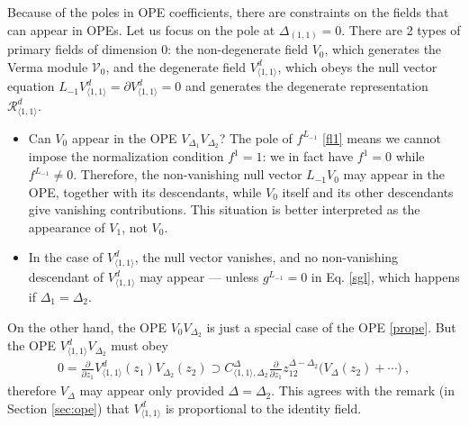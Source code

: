 \documentclass[12pt, a4paper]{article}
\theoremstyle{break}
\begin{document}
Because of the poles in OPE coefficients, there are constraints on the fields that can appear in OPEs. Let us focus on the pole at $\Delta_{(1,1)}=0$. There are 2 types of primary fields of dimension $0$: the non-degenerate field $V_0$, which generates the Verma module $\mathcal{V}_0$, and the degenerate field $V^d_{\langle 1,1\rangle}$, which obeys the null vector equation $L_{-1}V^d_{\langle 1,1\rangle}=\partial V^d_{\langle 1,1\rangle}=0$ and generates the degenerate representation $\mathcal{R}^d_{\langle 1,1\rangle}$. 
\begin{itemize}
 \item Can $V_0$ appear in the OPE $V_{\Delta_1}V_{\Delta_2}$? The pole of $f^{L_{-1}}$ \eqref{fl1} means we cannot impose the normalization condition $f^1=1$: we in fact have $f^1=0$ while $f^{L_{-1}}\neq 0$. Therefore, the non-vanishing null vector $L_{-1}V_0$ may appear in the OPE, together with its descendants, while $V_0$ itself and its other descendants give vanishing contributions. This situation is better interpreted as the appearance of $V_1$, not $V_0$.  
 \item In the case of $V^d_{\langle 1,1\rangle}$, the null vector vanishes, and no non-vanishing descendant of $V^d_{\langle 1,1\rangle}$ may appear --- unless $g^{L_{-1}}=0$ in Eq. \eqref{sgl}, which happens if $\Delta_1=\Delta_2$.
\end{itemize}
On the other hand, the OPE $V_0V_{\Delta_2}$ is just a special case of the OPE \eqref{prope}.
But the OPE $V^d_{\langle 1,1\rangle}V_{\Delta_2}$ must obey 
\begin{align}
 0 = \frac{\partial}{\partial z_1} V^d_{\langle 1,1\rangle}(z_1)V_{\Delta_2}(z_2) \supset C_{\langle 1,1\rangle,\Delta_2}^{\Delta} \frac{\partial}{\partial z_1} z_{12}^{\Delta-\Delta_2} \big(V_\Delta(z_2) +\cdots \big) \ ,
\end{align}
therefore $V_\Delta$ may appear only provided $\Delta=\Delta_2$. This agrees with the remark (in Section \ref{sec:ope}) that $V^d_{\langle 1,1\rangle}$ is proportional to the identity field. 
\end{document}
